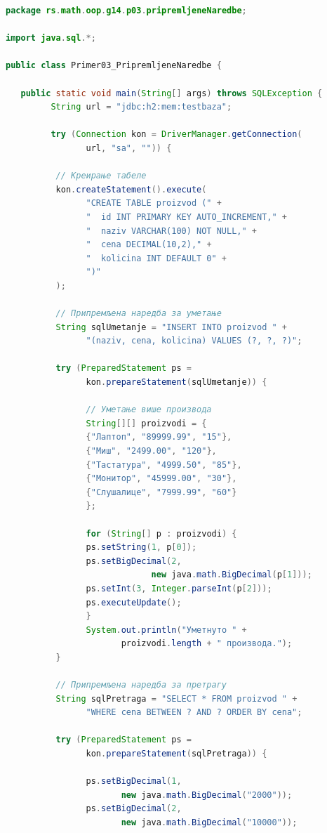 \begin{lstlisting}[language=Java]
package rs.math.oop.g14.p03.pripremljeneNaredbe;
 
import java.sql.*;
 
public class Primer03_PripremljeneNaredbe {
 
   public static void main(String[] args) throws SQLException {
         String url = "jdbc:h2:mem:testbaza";
 
         try (Connection kon = DriverManager.getConnection(
                url, "sa", "")) {
 
          // Креирање табеле
          kon.createStatement().execute(
                "CREATE TABLE proizvod (" +
                "  id INT PRIMARY KEY AUTO_INCREMENT," +
                "  naziv VARCHAR(100) NOT NULL," +
                "  cena DECIMAL(10,2)," +
                "  kolicina INT DEFAULT 0" +
                ")"
          );
 
          // Припремљена наредба за уметање
          String sqlUmetanje = "INSERT INTO proizvod " +
                "(naziv, cena, kolicina) VALUES (?, ?, ?)";
 
          try (PreparedStatement ps =
                kon.prepareStatement(sqlUmetanje)) {
 
                // Уметање више производа
                String[][] proizvodi = {
                {"Лаптоп", "89999.99", "15"},
                {"Миш", "2499.00", "120"},
                {"Тастатура", "4999.50", "85"},
                {"Монитор", "45999.00", "30"},
                {"Слушалице", "7999.99", "60"}
                };
 
                for (String[] p : proizvodi) {
                ps.setString(1, p[0]);
                ps.setBigDecimal(2,
                             new java.math.BigDecimal(p[1]));
                ps.setInt(3, Integer.parseInt(p[2]));
                ps.executeUpdate();
                }
                System.out.println("Уметнуто " +
                       proizvodi.length + " производа.");
          }
 
          // Припремљена наредба за претрагу
          String sqlPretraga = "SELECT * FROM proizvod " +
                "WHERE cena BETWEEN ? AND ? ORDER BY cena";
 
          try (PreparedStatement ps =
                kon.prepareStatement(sqlPretraga)) {
 
                ps.setBigDecimal(1,
                       new java.math.BigDecimal("2000"));
                ps.setBigDecimal(2,
                       new java.math.BigDecimal("10000"));
 

\end{lstlisting}

